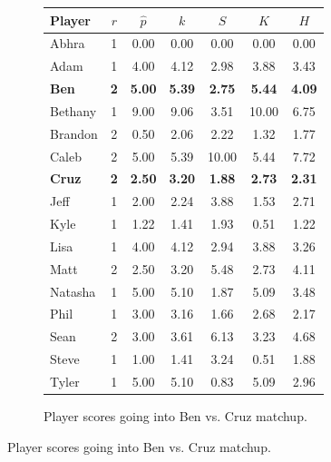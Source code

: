 \documentclass[letterpaper, 10 pt, conference]{ieeeconf}  %
\begin{document}
\begin{figure}[h!b]
        \centering
        \begin{subfigure}[hb]{0.4\textwidth}
                \footnotesize
                \centering
                \begin{tabular}{lccc|ccc}
                        \toprule
                        Player  & $r$   & $\hat{p}$ & $k$ & $S$ & $K$ & $H$ \\
                        \midrule
                        Abhra	& 1	& 0.00	& 0.00 & 0.00 & 0.00 & 0.00 \\
                        Adam	& 1	& 4.00	& 4.12 & 2.98 & 3.88 & 3.43 \\
                        \textbf{Ben}	& \textbf{2}	& \textbf{5.00}	& \textbf{5.39} & \textbf{2.75} & \textbf{5.44} & \textbf{4.09} \\
                        Bethany	& 1	& 9.00	& 9.06 & 3.51 & 10.00 & 6.75 \\
                        Brandon	& 2	& 0.50	& 2.06 & 2.22 & 1.32 & 1.77 \\
                        Caleb	& 2	& 5.00	& 5.39 & 10.00 & 5.44 & 7.72 \\
                        \textbf{Cruz}	& \textbf{2}	& \textbf{2.50}	& \textbf{3.20} & \textbf{1.88} & \textbf{2.73} & \textbf{2.31} \\
                        Jeff	& 1	& 2.00  & 2.24 & 3.88 & 1.53 & 2.71 \\
                        Kyle	& 1	& 1.22	& 1.41 & 1.93 & 0.51 & 1.22 \\
                        Lisa	& 1	& 4.00  & 4.12 & 2.94 & 3.88 & 3.26 \\
                        Matt	& 2	& 2.50  & 3.20 & 5.48 & 2.73 & 4.11 \\
                        Natasha	& 1	& 5.00  & 5.10 & 1.87 & 5.09 & 3.48 \\
                        Phil	& 1	& 3.00	& 3.16 & 1.66 & 2.68 & 2.17 \\
                        Sean	& 2	& 3.00	& 3.61 & 6.13 & 3.23 & 4.68 \\
                        Steve	& 1	& 1.00 	& 1.41 & 3.24 & 0.51 & 1.88 \\
                        Tyler	& 1	& 5.00  & 5.10 & 0.83 & 5.09 & 2.96 \\
                        \bottomrule
                \end{tabular}
                \caption{Player scores going into Ben vs. Cruz matchup.}
        \end{subfigure}

\end{figure}
\end{document}
